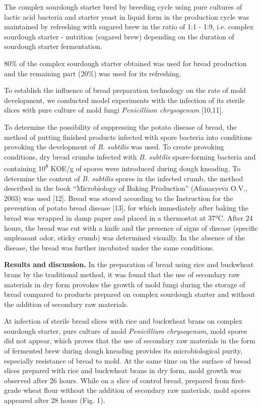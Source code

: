 The complex sourdough starter bred by breeding cycle using pure cultures
of lactic acid bacteria and starter yeast in liquid form in the
production cycle was maintained by refreshing with sugared brew in the
ratio of 1:1 - 1:9, i.e. complex sourdough starter - nutrition (sugared
brew) depending on the duration of sourdough starter fermentation.

80\% of the complex sourdough starter obtained was used for bread
production and the remaining part (20\%) was used for its refreshing.

To establish the influence of bread preparation technology on the rate
of mold development, we conducted model experiments with the infection
of its sterile slices with pure culture of mold fungi \emph{Penicillium
chrysogenum} {[}10,11{]}.

To determine the possibility of suppressing the potato disease of bread,
the method of putting finished products infected with spore bacteria
into conditions provoking the development of \emph{B. subtilis} was
used. To create provoking conditions, dry bread crumbs infected with
\emph{B. subtilis} spore-forming bacteria and containing
10\textsuperscript{8} KOE/g of spores were introduced during dough
kneading. To determine the content of \emph{B. subtilis} spores in the
infected crumb, the method described in the book ``Microbiology of
Baking Production'' (Afanasyeva O.V., 2003) was used {[}12{]}. Bread was
stored according to the Instruction for the prevention of potato bread
disease {[}13{]}, for which immediately after baking the bread was
wrapped in damp paper and placed in a thermostat at 37°C. After 24
hours, the bread was cut with a knife and the presence of signs of
disease (specific unpleasant odor, sticky crumb) was determined
visually. In the absence of the disease, the bread was further incubated
under the same conditions.

{\bfseries Results and discussion.} In the preparation of bread using rice
and buckwheat brans by the traditional method, it was found that the use
of secondary raw materials in dry form provokes the growth of mold fungi
during the storage of bread compared to products prepared on complex
sourdough starter and without the addition of secondary raw materials.

At infection of sterile bread slices with rice and buckwheat brans on
complex sourdough starter, pure culture of mold \emph{Penicillium
chrysogenum}, mold spores did not appear, which proves that the use of
secondary raw materials in the form of fermented brew during dough
kneading provides its microbiological purity, especially resistance of
bread to mold. At the same time on the surface of bread slices prepared
with rice and buckwheat brans in dry form, mold growth was observed
after 26 hours. While on a slice of control bread, prepared from
first-grade wheat flour without the addition of secondary raw materials,
mold spores appeared after 28 hours (Fig. 1).

